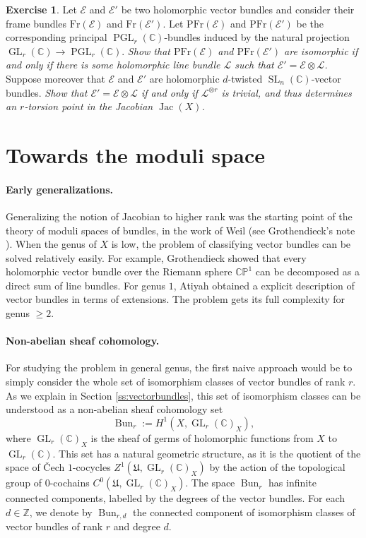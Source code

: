 \documentclass[12pt,a4paper]{amsbook}
\theoremstyle{remark} \newtheorem{rmk}[thm]{Remark}
\theoremstyle{definition} \newtheorem{defn}[thm]{Definition}
\theoremstyle{definition} \newtheorem{ex}[thm]{Example}
\theoremstyle{definition} \newtheorem{ej}{Exercise}
\newcommand{\C}{\mathbb C}
\newcommand{\Z}{\mathbb Z}
\newcommand{\fU}{\mathfrak U}
\newcommand{\sE}{\mathscr E}
\newcommand{\sL}{\mathscr L}
\DeclareMathOperator{\Jac}{Jac}
\DeclareMathOperator{\Bun}{Bun}
\DeclareMathOperator{\GL}{GL}
\DeclareMathOperator{\SL}{SL}
\DeclareMathOperator{\PGL}{PGL}
\begin{document}
\begin{ej}
Let $\sE$ and $\sE'$ be two holomorphic vector bundles and consider their frame bundles $\mathrm{Fr}(\sE)$ and $\mathrm{Fr}(\sE')$. Let $\mathrm{PFr}(\sE)$ and $\mathrm{PFr}(\sE')$ be the corresponding principal $\PGL_r(\C)$-bundles induced by the natural projection $\GL_r(\C)\rightarrow \PGL_r(\C)$. \textit{Show that $\mathrm{PFr}(\sE)$ and $\mathrm{PFr}(\sE')$ are isomorphic if and only if there is some holomorphic line bundle $\sL$ such that $\sE'=\sE \otimes \sL$.}
Suppose moreover that $\sE$ and $\sE'$ are holomorphic $d$-twisted $\SL_n(\C)$-vector bundles. \textit{Show that $\sE'=\sE \otimes \sL$ if and only if $\sL^{\otimes r}$ is trivial, and thus determines an $r$-torsion point in the Jacobian $\Jac(X)$.}
\end{ej}

\section{Towards the moduli space}

\paragraph{Early generalizations.} Generalizing the notion of Jacobian to higher rank was the starting point of the theory of moduli spaces of bundles, in the work of Weil (see Grothendieck's note \cite{Grothendieck_Bourbaki}).
When the genus of $X$ is low, the problem of classifying vector bundles can be solved relatively easily. For example, Grothendieck \cite{Grothendieck} showed that every holomorphic vector bundle over the Riemann sphere $\C\mathbb{P}^1$ can be decomposed as a direct sum of line bundles. For genus $1$, Atiyah \cite{atiyah} obtained a explicit description of vector bundles in terms of extensions. The problem gets its full complexity for genus $\geq 2$.

\paragraph{Non-abelian sheaf cohomology.} For studying the problem in general genus, the first naive approach would be to simply consider the whole set of isomorphism classes of vector bundles of rank $r$. As we explain in Section \ref{ss:vectorbundles}, this set of isomorphism classes can be understood as a non-abelian sheaf cohomology set
\begin{equation*}
\Bun_{r}:=H^1(X,\GL_r(\C)_X),
\end{equation*}
where $\GL_r(\C)_X$ is the sheaf of germs of holomorphic functions from $X$ to $\GL_r(\C)$. This set has a natural geometric structure, as it is the quotient of the space of \v{C}ech $1$-cocycles $Z^1(\mathfrak{U},\GL_r(\C)_X)$ by the action of the topological group of $0$-cochains $C^0(\fU,\GL_r(\C)_X)$. The space $\Bun_r$ has infinite connected components, labelled by the degrees of the vector bundles. For each $d\in \Z$, we denote by $\Bun_{r,d}$ the connected component of isomorphism classes of vector bundles of rank $r$ and degree $d$.
\end{document}
